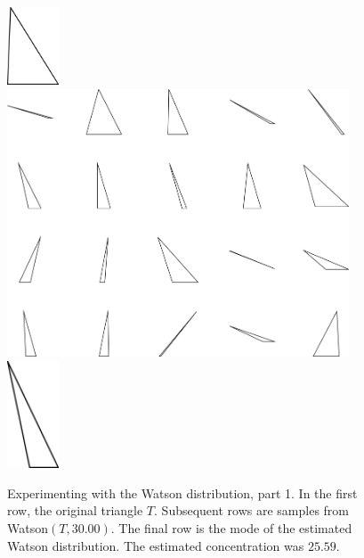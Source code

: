 \begin{figure}
\includegraphics[width=0.6in]{output/1.models/test_watson/watson_1_true.png}\\ 
\includegraphics[width=4in]{output/1.models/test_watson/watson_1_samples.png}\\ 
\includegraphics[width=0.6in]{output/1.models/test_watson/watson_1_est.png}
\caption{Experimenting with the Watson distribution, part 1. In the first row, the original triangle $T$. Subsequent rows are samples from Watson$(T,30.00)$. The final row is the mode of the estimated Watson distribution. The estimated concentration was $25.59$.}
\label{fig-watson-1}
\end{figure}


